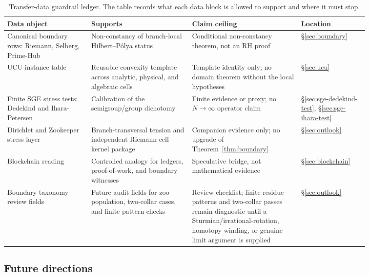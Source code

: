 \documentclass[11pt]{article}
\theoremstyle{definition}
\theoremstyle{remark}
\begin{document}
\begin{table}[htbp]
\centering
\scriptsize
\renewcommand{\arraystretch}{1.13}
\setlength{\tabcolsep}{3pt}
\begin{tabular}{@{}p{0.20\linewidth}p{0.24\linewidth}p{0.26\linewidth}p{0.16\linewidth}@{}}
\toprule
Data object & Supports & Claim ceiling & Location \\
\midrule
Canonical boundary rows:
Riemann, Selberg, Prime-Hub &
Non-constancy of branch-local Hilbert--P\'olya status &
Conditional non-constancy theorem, not an RH proof &
\S\ref{sec:boundary} \\
UCU instance table &
Reusable convexity template across analytic, physical, and algebraic cells &
Template identity only; no domain theorem without the local hypotheses &
\S\ref{sec:ucu} \\
Finite SGE stress tests:
Dedekind and Ihara-Petersen &
Calibration of the semigroup/group dichotomy &
Finite evidence or proxy; no $N\to\infty$ operator claim &
\S\ref{sec:sge-dedekind-test}, \S\ref{sec:sge-ihara-test} \\
Dirichlet and Zookeeper stress layer &
Branch-transversal tension and independent Riemann-cell kernel package &
Companion evidence only; no upgrade of Theorem~\ref{thm:boundary} &
\S\ref{sec:outlook} \\
Blockchain reading &
Controlled analogy for ledgers, proof-of-work, and boundary witnesses &
Speculative bridge, not mathematical evidence &
\S\ref{sec:blockchain} \\
Boundary-taxonomy review fields &
Future audit fields for zoo population, two-collar cases, and finite-pattern checks &
Review checklist; finite residue patterns and two-collar passes remain
diagnostic until a Sturmian/irrational-rotation, homotopy-winding, or
genuine limit argument is supplied &
\S\ref{sec:outlook} \\
\bottomrule
\end{tabular}
\caption{Transfer-data guardrail ledger. The table records what each
data block is allowed to support and where it must stop.}
\label{tab:transfer-data-ledger}
\end{table}

\subsection{Future directions}
\end{document}
